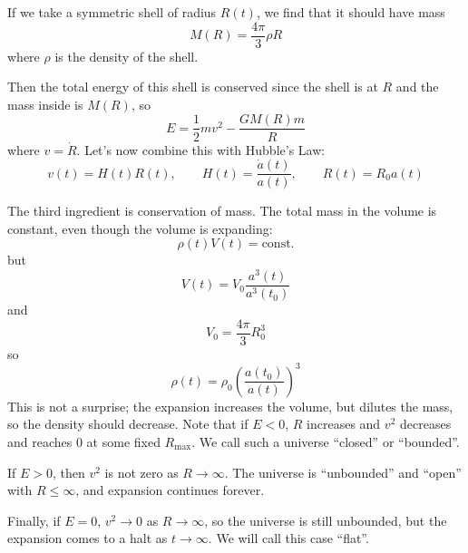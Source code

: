\documentclass[a4paper,twoside,master.tex]{subfiles}
\begin{document}

If we take a symmetric shell of radius $ R(t) $, we find that it should have mass
\begin{equation}
    M(R) = \frac{4 \pi}{3} \rho R
\end{equation}
where $ \rho $ is the density of the shell.

Then the total energy of this shell is conserved since the shell is at $ R $ and the mass inside is $ M(R) $, so
\begin{equation}
    E = \frac{1}{2} mv^2 - \frac{GM(R) m}{R}
\end{equation}
where $ v = \dot{R} $. Let's now combine this with Hubble's Law:
\begin{equation}
    v(t) = H(t) R(t),\qquad H(t) = \frac{\dot{a}(t)}{a(t)},\qquad R(t) = R_0 a(t)
\end{equation}

The third ingredient is conservation of mass. The total mass in the volume is constant, even though the volume is expanding:
\begin{equation}
    \rho(t) V(t) = \text{const.}
\end{equation}
but
\begin{equation}
    V(t) = V_0 \frac{a^3(t)}{a^3(t_0)}
\end{equation}
and
\begin{equation}
    V_0 = \frac{4 \pi}{3} R_0^3
\end{equation}
so
\begin{equation}
    \rho(t) = \rho_0 \left( \frac{a(t_0)}{a(t)} \right)^3
\end{equation}
This is not a surprise; the expansion increases the volume, but dilutes the mass, so the density should decrease. Note that if $ E < 0 $, $ R $ increases and $ v^2 $ decreases and reaches $ 0 $ at some fixed $ R_{\text{max}} $. We call such a universe ``closed'' or ``bounded''.

If $ E > 0 $, then $ v^2 $ is not zero as $ R \to \infty $. The universe is ``unbounded'' and ``open'' with $ R \leq \infty $, and expansion continues forever.

Finally, if $ E = 0 $, $ v^2 \to 0 $ as $ R \to \infty $, so the universe is still unbounded, but the expansion comes to a halt as $ t \to \infty $. We will call this case ``flat''.
\end{document}
